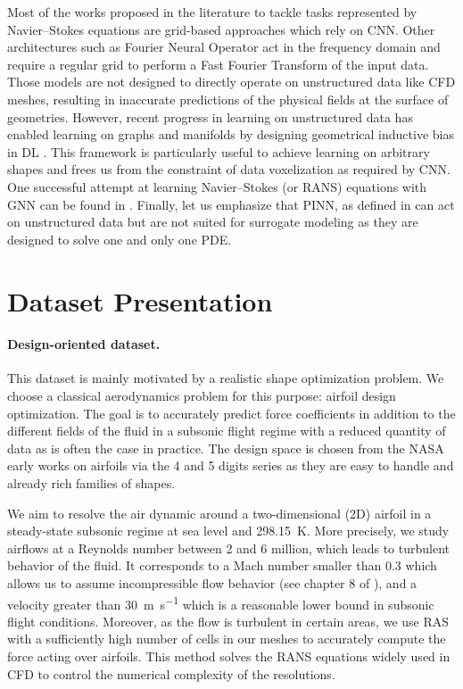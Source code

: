 Most of the works proposed in the literature to tackle tasks represented by Navier–Stokes equations are grid-based approaches \cite{um2020sol,thuerey2020deepFlowPred,mohan2020embedding,wandel2021learning,10.1145/3392717.3392772,gupta2021multiwaveletbased, tfnet} which rely on \acrfull{CNN}. Other architectures such as Fourier Neural Operator \cite{fno} act in the frequency domain and require a regular grid to perform a Fast Fourier Transform of the input data. Those models are not designed to directly operate on unstructured data like \acrshort{CFD} meshes, resulting in inaccurate predictions of the physical fields at the surface of geometries. However, recent progress in learning on unstructured data \cite{DBLP:journals/spm/BronsteinBLSV17} has enabled learning on graphs and manifolds by designing geometrical inductive bias in \acrshort{DL} \cite{1555942,4700287,Li2016GatedGS,Kipf:2016tc,pmlr-v80-sanchez-gonzalez18a}. This framework is particularly useful to achieve learning on arbitrary shapes and frees us from the constraint of data voxelization as required by CNN. One successful attempt at learning Navier–Stokes (or \acrshort{RANS}) equations with \acrfull{GNN} can be found in \cite{pfaff2021learning}. Finally, let us emphasize that \acrshort{PINN}, as defined in \cite{pinns} can act on unstructured data but are not suited for surrogate modeling as they are designed to solve one and only one \acrshort{PDE}.

\section{Dataset Presentation} \label{sec:dataset}
\paragraph{Design-oriented dataset.} This dataset is mainly motivated by a realistic shape optimization problem. We choose a classical aerodynamics problem for this purpose: airfoil design optimization. The goal is to accurately predict force coefficients in addition to the different fields of the fluid in a subsonic flight regime with a reduced quantity of data as is often the case in practice. The design space is chosen from the \acrfull{NASA} early works on airfoils via the 4 and 5 digits series \cite{naca} as they are easy to handle and already rich families of shapes.

We aim to resolve the air dynamic around a two-dimensional (2D) airfoil in a steady-state subsonic regime at sea level and \SI{298.15}{\kelvin}. More precisely, we study airflows at a Reynolds number between 2 and 6 million, which leads to turbulent behavior of the fluid. It corresponds to a Mach number smaller than 0.3 which allows us to assume incompressible flow behavior (see chapter 8 of \cite{aero}), and a velocity greater than \SI{30}{\meter\per\second} which is a reasonable lower bound in subsonic flight conditions. Moreover, as the flow is turbulent in certain areas, we use \acrfull{RAS} with a sufficiently high number of cells in our meshes to accurately compute the force acting over airfoils. This method solves the \acrshort{RANS} equations widely used in \acrshort{CFD} to control the numerical complexity of the resolutions.

